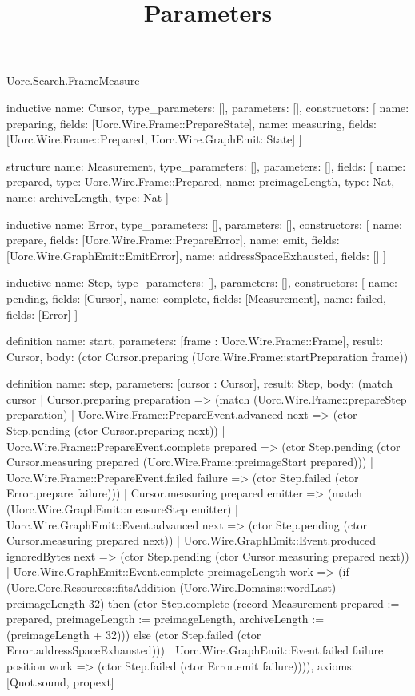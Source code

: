 \begin{lexlean}{Uorc.Search.FrameMeasure}
\title{Parameters}
\begin{semanticmodule}
inductive{
  name: Cursor,
  type_parameters: [],
  parameters: [],
  constructors: [
    {name: preparing, fields: [Uorc.Wire.Frame::PrepareState]},
    {name: measuring, fields: [Uorc.Wire.Frame::Prepared, Uorc.Wire.GraphEmit::State]}
  ]
}

structure{
  name: Measurement,
  type_parameters: [],
  parameters: [],
  fields: [
    {name: prepared, type: Uorc.Wire.Frame::Prepared},
    {name: preimageLength, type: Nat},
    {name: archiveLength, type: Nat}
  ]
}

inductive{
  name: Error,
  type_parameters: [],
  parameters: [],
  constructors: [
    {name: prepare, fields: [Uorc.Wire.Frame::PrepareError]},
    {name: emit, fields: [Uorc.Wire.GraphEmit::EmitError]},
    {name: addressSpaceExhausted, fields: []}
  ]
}

inductive{
  name: Step,
  type_parameters: [],
  parameters: [],
  constructors: [
    {name: pending, fields: [Cursor]},
    {name: complete, fields: [Measurement]},
    {name: failed, fields: [Error]}
  ]
}

definition{
  name: start,
  parameters: [frame : Uorc.Wire.Frame::Frame],
  result: Cursor,
  body: (ctor Cursor.preparing (Uorc.Wire.Frame::startPreparation frame))
}

definition{
  name: step,
  parameters: [cursor : Cursor],
  result: Step,
  body: (match cursor
    | Cursor.preparing preparation => (match (Uorc.Wire.Frame::prepareStep preparation)
      | Uorc.Wire.Frame::PrepareEvent.advanced next => (ctor Step.pending (ctor Cursor.preparing next))
      | Uorc.Wire.Frame::PrepareEvent.complete prepared => (ctor Step.pending (ctor Cursor.measuring prepared (Uorc.Wire.Frame::preimageStart prepared)))
      | Uorc.Wire.Frame::PrepareEvent.failed failure => (ctor Step.failed (ctor Error.prepare failure)))
    | Cursor.measuring prepared emitter => (match (Uorc.Wire.GraphEmit::measureStep emitter)
      | Uorc.Wire.GraphEmit::Event.advanced next => (ctor Step.pending (ctor Cursor.measuring prepared next))
      | Uorc.Wire.GraphEmit::Event.produced ignoredBytes next => (ctor Step.pending (ctor Cursor.measuring prepared next))
      | Uorc.Wire.GraphEmit::Event.complete preimageLength work => (if (Uorc.Core.Resources::fitsAddition (Uorc.Wire.Domains::wordLast) preimageLength 32) then (ctor Step.complete (record Measurement {prepared := prepared, preimageLength := preimageLength, archiveLength := (preimageLength + 32)})) else (ctor Step.failed (ctor Error.addressSpaceExhausted)))
      | Uorc.Wire.GraphEmit::Event.failed failure position work => (ctor Step.failed (ctor Error.emit failure)))),
  axioms: [Quot.sound, propext]
}


\end{semanticmodule}
\end{lexlean}
